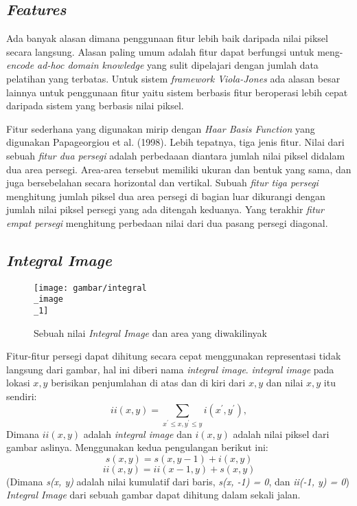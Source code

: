 \subsection{\emph{Features}}

Ada banyak alasan dimana penggunaan fitur lebih baik daripada 
nilai piksel secara langsung. Alasan paling umum adalah fitur dapat berfungsi
untuk meng-\emph{encode ad-hoc domain knowledge} yang sulit dipelajari 
dengan jumlah data pelatihan yang terbatas. Untuk sistem \emph{framework Viola-Jones} 
ada alasan besar lainnya untuk penggunaan fitur yaitu sistem berbasis fitur beroperasi lebih cepat
daripada sistem yang berbasis nilai piksel.

Fitur sederhana yang digunakan mirip dengan \emph{Haar Basis Function} yang 
digunakan Papageorgiou et al. (1998). Lebih tepatnya, tiga jenis fitur. 
Nilai dari sebuah \emph{fitur dua persegi} adalah perbedaaan diantara 
jumlah nilai piksel didalam dua area persegi. Area-area tersebut memiliki 
ukuran dan bentuk yang sama, dan juga bersebelahan secara horizontal dan vertikal.
Subuah \emph{fitur tiga persegi} menghitung jumlah piksel dua area persegi 
di bagian luar dikurangi dengan jumlah nilai piksel persegi yang ada ditengah keduanya. 
Yang terakhir \emph{fitur empat persegi} menghitung perbedaan nilai dari dua pasang 
persegi diagonal.

\subsection{\emph{Integral Image}}

\begin{figure}[H]
  \centering{}
	\texttt{[image: gambar/integral\\\_image\\\_1]}
  \caption{Sebuah nilai \emph{Integral Image} dan area yang diwakilinyak}
\end{figure}

Fitur-fitur persegi dapat dihitung secara cepat menggunakan 
representasi tidak langsung dari gambar, hal ini diberi nama 
\emph{integral image}. \emph{integral image} pada lokasi $x, y$ berisikan 
penjumlahan di atas dan di kiri dari $x, y$ dan nilai $x, y$ itu sendiri:
\begin{equation}
  i i(x, y)=\sum_{x^{\prime} \leq x, y^{\prime} \leq y} i\left(x^{\prime}, y^{\prime}\right),
\end{equation}
Dimana $ii(x,y)$ adalah \emph{integral image} dan $i(x,y)$ 
adalah nilai piksel dari gambar aslinya. Menggunakan kedua 
pengulangan berikut ini:
\begin{equation}
  s(x, y)=s(x, y-1) + i(x, y)
\end{equation}
\begin{equation}
  ii(x, y)=ii(x-1, y) + s(x, y)
\end{equation}
(Dimana \emph{s(x, y)} adalah nilai kumulatif dari baris, \emph{s(x, -1) = 0}, 
dan \emph{ii(-1, y) = 0}) \emph{Integral Image} dari sebuah gambar dapat dihitung dalam sekali jalan.

